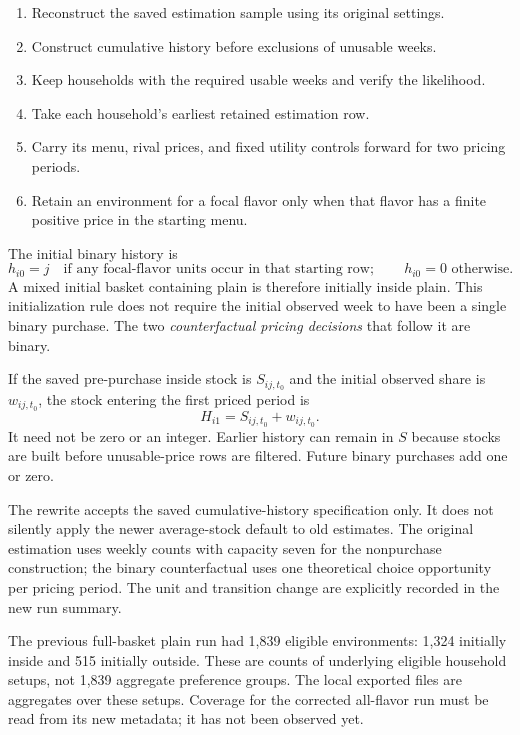 \documentclass[11pt]{article}
\newcommand{\important}[1]{\begin{tcolorbox}[colback=white,colframe=warning]#1\end{tcolorbox}}
\begin{document}
\begin{enumerate}
\item Reconstruct the saved estimation sample using its original settings.
\item Construct cumulative history before exclusions of unusable weeks.
\item Keep households with the required usable weeks and verify the likelihood.
\item Take each household's earliest retained estimation row.
\item Carry its menu, rival prices, and fixed utility controls forward for two pricing periods.
\item Retain an environment for a focal flavor only when that flavor has a finite positive price in the starting menu.
\end{enumerate}

The initial binary history is
\[
 h_{i0}=j\quad\text{if any focal-flavor units occur in that starting row};\qquad h_{i0}=0\text{ otherwise}.
\]
A mixed initial basket containing plain is therefore initially inside plain. This initialization rule does not require the initial observed week to have been a single binary purchase. The two \emph{counterfactual pricing decisions} that follow it are binary.

If the saved pre-purchase inside stock is $S_{ij,t_0}$ and the initial observed share is $w_{ij,t_0}$, the stock entering the first priced period is
\[
 H_{i1}=S_{ij,t_0}+w_{ij,t_0}.
\]
It need not be zero or an integer. Earlier history can remain in $S$ because stocks are built before unusable-price rows are filtered. Future binary purchases add one or zero.

\important{The rewrite accepts the saved cumulative-history specification only. It does not silently apply the newer average-stock default to old estimates. The original estimation uses weekly counts with capacity seven for the nonpurchase construction; the binary counterfactual uses one theoretical choice opportunity per pricing period. The unit and transition change are explicitly recorded in the new run summary.}

The previous full-basket plain run had 1,839 eligible environments: 1,324 initially inside and 515 initially outside. These are counts of underlying eligible household setups, not 1,839 aggregate preference groups. The local exported files are aggregates over these setups. Coverage for the corrected all-flavor run must be read from its new metadata; it has not been observed yet.
\end{document}
